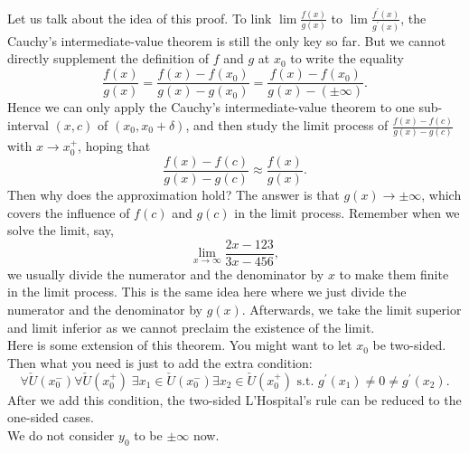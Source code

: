\documentclass{article}
\begin{document}
\begin{Rmk}{}
    Let us talk about the idea of this proof. To link $\lim\frac{f(x)}{g(x)}$ to $\lim\frac{f^\prime(x)}{g^\prime(x)}$, the Cauchy's intermediate-value theorem is still the only key so far. But we cannot directly supplement the definition of $f$ and $g$ at $x_0$ to write the equality
    $$ \frac{f(x)}{g(x)} = \frac{f(x)-f(x_0)}{g(x)-g(x_0)} = \frac{f(x)-f(x_0)}{g(x)-(\pm\infty)}. $$
    Hence we can only apply the Cauchy's intermediate-value theorem to one sub-interval $(x,c)$ of $(x_0, x_0+\delta)$, and then study the limit process of $\frac{f(x)-f(c)}{g(x)-g(c)}$ with $x\rightarrow x_0^+$, hoping that 
    $$\frac{f(x)-f(c)}{g(x)-g(c)}\approx \frac{f(x)}{g(x)}.$$ 
    Then why does the approximation hold? The answer is that $g(x)\rightarrow\pm\infty$, which covers the influence of $f(c)$ and $g(c)$ in the limit process. Remember when we solve the limit, say, 
    $$ \lim\limits_{x\to\infty} \frac{2x-123}{3x-456}, $$
    we usually divide the numerator and the denominator by $x$ to make them finite in the limit process. This is the same idea here where we just divide the numerator and the denominator by $g(x)$. Afterwards, we take the limit superior and limit inferior as we cannot preclaim the existence of the limit.\\
    Here is some extension of this theorem. \textcolor{Th}{You might want to let $x_0$ be two-sided. Then what you need is just to add the extra condition:
    $$ \forall\check{U}(x_0^-)\forall\check{U}(x_0^+)\;\exists x_1\in\check{U}(x_0^-)\exists x_2\in\check{U}(x_0^+) \text{ s.t. } g^\prime(x_1)\neq 0\neq g^\prime(x_2). $$
    After we add this condition, the two-sided L'Hospital's rule can be reduced to the one-sided cases. \\
    We do not consider $y_0$ to be $\pm\infty$ now.}
\end{Rmk}
\end{document}
